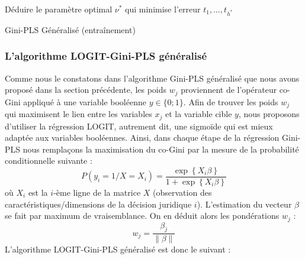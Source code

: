 \begin{algorithm}[h]
	\small
	Déduire le paramètre optimal $\nu^*$ qui minimise l'erreur \; 
	\Return $t_1,\ldots,t_{h^*}$\;
	\caption{Gini-PLS Généralisé (entraînement)}\label{G-GPLS}
\end{algorithm}
\bigskip

\subsubsection{L'algorithme LOGIT-Gini-PLS généralisé} 
\label{sec:sensresultat:logit-gini-pls}
Comme nous le constatons dans l'algorithme Gini-PLS généralisé que nous avons proposé dans la section précédente, les poids $w_j$ proviennent de l'opérateur co-Gini appliqué à une variable booléenne $y \in \lbrace 0;1 \rbrace$. Afin de trouver les poids $w_j$ qui maximisent le lien entre les variables $x_j$ et la variable cible $y$, nous proposons d'utiliser la régression LOGIT, autrement dit, une sigmoïde qui est mieux adaptée aux variables booléennes. Ainsi, dans chaque étape de la régression Gini-PLS nous remplaçons la maximisation du co-Gini par la mesure de la probabilité conditionnelle suivante :
\begin{equation}\tag{LOGIT}
P(y_i = 1 / X = X_i) = \frac{\exp\left\{X_i \beta \right\}}{1+\exp\left\{ X_i \beta \right\}}
\end{equation}
où $X_i$ est la $i$-ème ligne de la matrice $X$ (observation des caractéristiques/dimensions de la décision juridique $i$). L'estimation du vecteur $\beta$ se fait par maximum de vraisemblance. On en déduit alors les pondérations $w_j$ :
\[
w_j = \frac{\beta_j}{\| \beta\|}
\]
L'algorithme LOGIT-Gini-PLS généralisé est donc le suivant :

